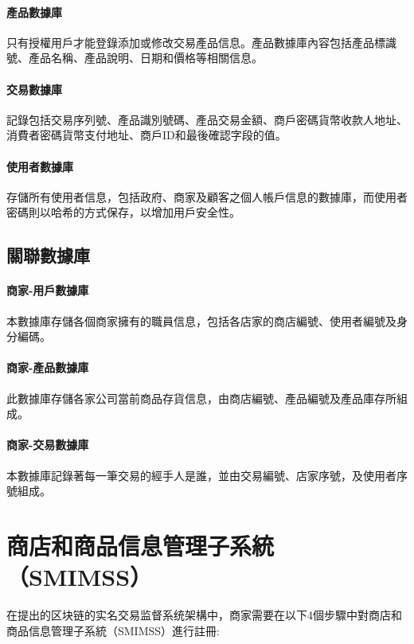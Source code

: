 			\paragraph{產品數據庫}只有授權用戶才能登錄添加或修改交易產品信息。產品數據庫內容包括產品標識號、產品名稱、產品說明、日期和價格等相關信息。
			\paragraph{交易數據庫}記錄包括交易序列號、產品識別號碼、產品交易金額、商戶密碼貨幣收款人地址、消費者密碼貨幣支付地址、商戶ID和最後確認字段的值。
			\paragraph{使用者數據庫}存儲所有使用者信息，包括政府、商家及顧客之個人帳戶信息的數據庫，而使用者密碼則以哈希的方式保存，以增加用戶安全性。

		\subsection{關聯數據庫}

			\paragraph{商家-用戶數據庫}本數據庫存儲各個商家擁有的職員信息，包括各店家的商店編號、使用者編號及身分編碼。
			\paragraph{商家-產品數據庫}此數據庫存儲各家公司當前商品存貨信息，由商店編號、產品編號及產品庫存所組成。
			\paragraph{商家-交易數據庫}本數據庫記錄著每一筆交易的經手人是誰，並由交易編號、店家序號，及使用者序號組成。

	\section{商店和商品信息管理子系統（SMIMSS）}
	在提出的区块链的实名交易监督系统架構中，商家需要在以下4個步驟中對商店和商品信息管理子系統（SMIMSS）進行註冊:

